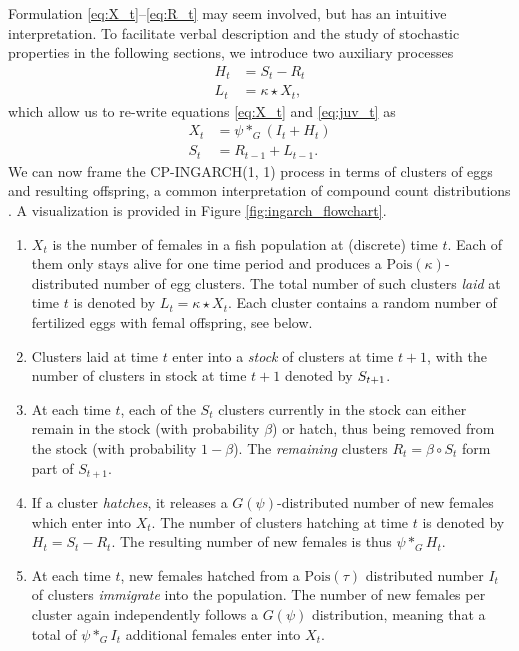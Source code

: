 \documentclass{article}
\begin{document}
Formulation \eqref{eq:X_t}--\eqref{eq:R_t} may seem involved, but has an intuitive interpretation. To facilitate verbal description and the study of stochastic properties in the following sections, we introduce two auxiliary processes
\begin{align}
H_t & = S_t - R_t \label{eq:H_t}\\
L_t & = \kappa \star X_t \label{eq:L_t},
\end{align}
which allow us to re-write equations \eqref{eq:X_t} and \eqref{eq:juv_t} as
\begin{align}
X_t & = \psi *_G (I_t + H_t)\label{eq:X_t_v2}\\
S_t & = R_{t - 1} + L_{t - 1}.\label{eq:juv_t_v2}
\end{align}
We can now frame the CP-INGARCH(1, 1) process in terms of clusters of eggs and resulting offspring, a common interpretation of compound count distributions \cite{Neyman1939}. A visualization is provided in Figure \ref{fig:ingarch_flowchart}.

\begin{enumerate}
\item $X_t$ is the number of females in a fish population at (discrete) time $t$. Each of them only stays alive for one time period and produces a $\text{Pois}(\kappa)$-distributed number of egg clusters. The total number of such clusters \textit{laid} at time $t$ is denoted by $L_t = \kappa \star X_t$. Each cluster contains a random number of fertilized eggs with femal offspring, see below.
\item Clusters laid at time $t$ enter into a \textit{stock} of clusters at time $t + 1$, with the number of clusters in stock at time $t + 1$ denoted by $S_{t + 1}$.
\item At each time $t$, each of the $S_t$ clusters currently in the stock can either remain in the stock (with probability $\beta$) or hatch, thus being removed from the stock (with probability $1 - \beta$). The \textit{remaining} clusters $R_t = \beta \circ S_t$ form part of $S_{t + 1}$.
\item If a cluster \textit{hatches}, it releases a $G(\psi)$-distributed number of new females which enter into $X_t$. The number of clusters hatching at time $t$ is denoted by $H_t = S_t - R_t$. The resulting number of new females is thus $\psi *_G H_t$.
\item At each time $t$, new females hatched from a $\text{Pois}(\tau)$ distributed number $I_t$ of clusters \textit{immigrate} into the population. The number of new females per cluster again independently follows a $G(\psi)$ distribution, meaning that a total of $\psi *_G I_t$ additional females enter into $X_t$.
\end{enumerate}
\end{document}
